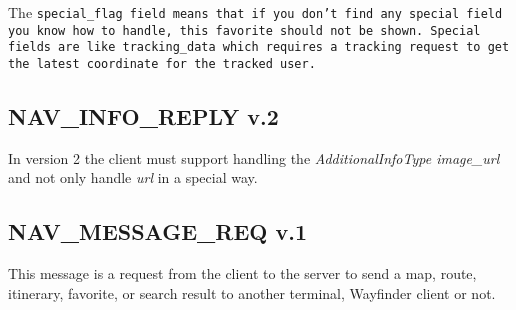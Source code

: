 \documentclass[a4paper]{article}
\begin{document}
The \tt{special\_flag} field means that if you don't find any special 
field you know how to handle, this favorite should not be shown. 
Special fields are like \tt{tracking\_data} which requires a tracking
request to get the latest coordinate for the tracked user.

\subsection{NAV\_INFO\_REPLY v.2}

In version 2 the client must support handling the \emph{AdditionalInfoType 
image\_url} and not only handle \emph{url} in a special way.


\subsection{NAV\_MESSAGE\_REQ v.1}
This message is a request from the client to the server to send a
map, route, itinerary, favorite, or search result to another
terminal, Wayfinder client or not.
\end{document}
